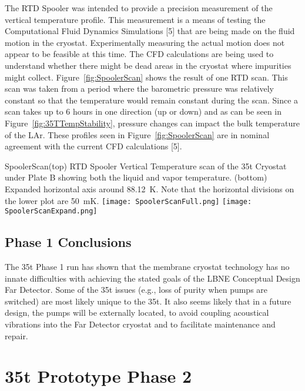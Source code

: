 The RTD Spooler was intended to provide a precision measurement of the vertical temperature profile. 
This measurement is a means of testing the Computational Fluid Dynamics Simulations [5] that 
are being made on the fluid motion in the cryostat. Experimentally measuring the actual motion does not 
appear to be feasible at this time. The CFD calculations are being used to understand whether there 
might be dead areas in the cryostat where impurities might collect. Figure~\ref{fig:SpoolerScan} shows the result of one RTD 
scan. This scan was taken from a period where the barometric pressure was relatively constant so that 
the temperature would remain constant during the scan. Since a scan takes up to 6 hours in one direction 
(up or down) and as can be seen in Figure~\ref{fig:35TTempStability}, pressure changes can impact the 
bulk temperature of the LAr. These profiles seen in Figure~\ref{fig:SpoolerScan} are in nominal 
agreement with the current CFD calculations [5].


\begin{cdrfigure}{SpoolerScan}{(top) RTD Spooler Vertical Temperature scan of the 35t Cryostat under Plate B showing both the liquid and vapor temperature.  (bottom) Expanded horizontal axis around 88.12~K. Note that the horizontal divisions on the lower plot are 50~mK. }
\texttt{[image: SpoolerScanFull.png]}
\texttt{[image: SpoolerScanExpand.png]}  
\end{cdrfigure}

\subsection{Phase 1 Conclusions}

The 35t Phase 1 run has shown that the membrane cryostat technology has no innate difficulties with 
achieving the stated goals of the LBNE Conceptual Design Far Detector. Some of the 35t issues (e.g., loss 
of purity when pumps are switched) are most likely unique to the 35t. It also seems likely that in a future 
design, the pumps will be externally located, to avoid coupling acoustical vibrations into the Far Detector 
cryostat and to facilitate maintenance and repair.

\section{35t Prototype Phase 2}

